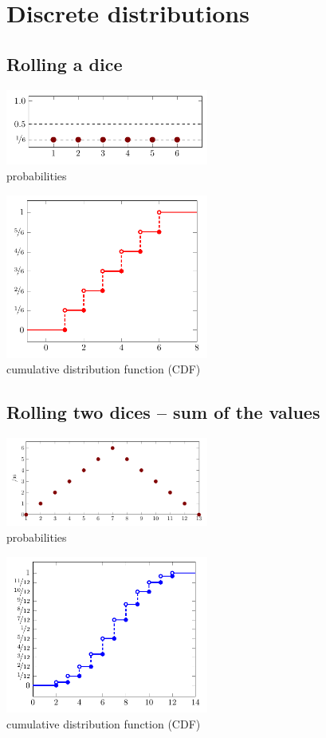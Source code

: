 \documentclass[a4paper]{article}
\begin{document}
	
	\section{Discrete distributions}
	\subsection{Rolling a dice}
		\begin{multicols}{2}
			\centering
			\includegraphics[width=0.5\textwidth]{dice_single_probability}\\
			probabilities 

			\includegraphics[width=0.5\textwidth]{dice_single_CDF}\\
			cumulative distribution function (CDF)				
		\end{multicols}
	
	\subsection{Rolling two dices -- sum of the values}
		\begin{multicols}{2}
			\centering
			\includegraphics[width=0.5\textwidth]{dice_double_probability}\\
			probabilities
			
			\includegraphics[width=0.5\textwidth]{dice_double_CDF}\\
			cumulative distribution function (CDF)
		\end{multicols}
\end{document}
